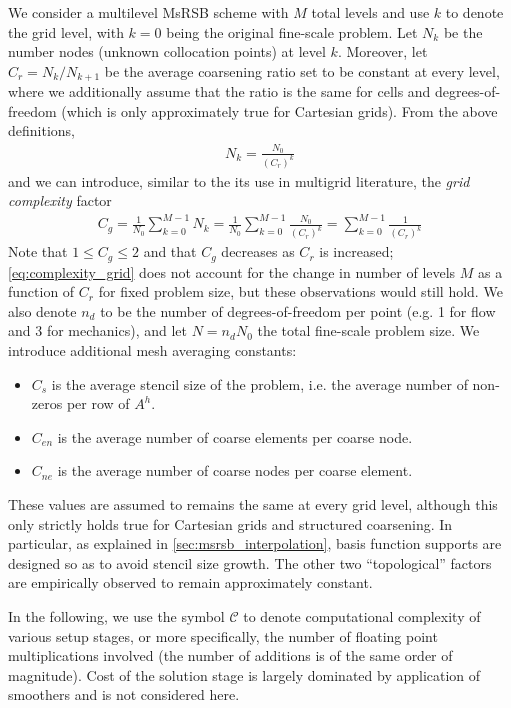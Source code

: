 We consider a multilevel MsRSB scheme with $M$ total levels and use $k$ to denote the grid level, with $k=0$ being the original fine-scale problem.   Let $N_k$ be the number nodes (unknown collocation points) at level $k$.   Moreover, let $C_r = N_k/N_{k+1}$ be the average coarsening ratio set to be constant at every level, where we additionally assume that the ratio is the same for cells and degrees-of-freedom (which is only approximately true for Cartesian grids).   From the above definitions,
\begin{align}
    N_k = \frac{N_0}{(C_r)^k}
\end{align}
and we can introduce, similar to the its use in multigrid literature, the \textit{grid complexity} factor
\begin{align}
    C_g = \frac{1}{N_0}\sum\limits_{k=0}^{M-1} N_k = \frac{1}{N_0}\sum\limits_{k=0}^{M-1}\frac{N_0}{(C_r)^k} = \sum\limits_{k=0}^{M-1}\frac{1}{(C_r)^k} \label{eq:complexity_grid}
\end{align}
Note that $1 \leq C_g \leq 2$ and that $C_g$ decreases as $C_r$ is increased; \cref{eq:complexity_grid} does not account for the change in number of levels $M$ as a function of $C_r$ for fixed problem size, but these observations would still hold.   We also denote $n_d$ to be the number of degrees-of-freedom per point (e.g. 1 for flow and 3 for mechanics), and let $N = n_d N_0$ the total fine-scale problem size.   We introduce additional mesh averaging constants:
\begin{itemize}
    \item $C_s$ is the average stencil size of the problem, i.e. the average number of non-zeros per row of $A^h$.
    \item $C_{en}$ is the average number of coarse elements per coarse node.
    \item $C_{ne}$ is the average number of coarse nodes per coarse element.
\end{itemize}
These values are assumed to remains the same at every grid level, although this only strictly holds true for Cartesian grids and structured coarsening.   In particular, as explained in \cref{sec:msrsb_interpolation}, basis function supports are designed so as to avoid stencil size growth.   The other two ``topological'' factors are empirically observed to remain approximately constant.

In the following, we use the symbol $\mathcal{C}$ to denote computational complexity of various setup stages, or more specifically, the number of floating point multiplications involved (the number of additions is of the same order of magnitude).   Cost of the solution stage is largely dominated by application of smoothers and is not considered here.


